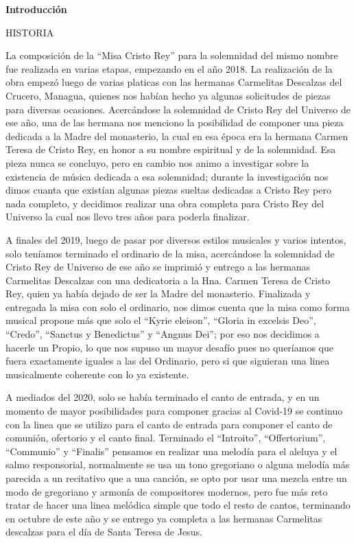 \documentclass[12pt, letterpaper]{report}
\begin{document}
    \begin{center}
        \vspace*{9cm}
        \textbf{\Huge Introducci\'on}
    \end{center}
    \clearpage

    \LARGE HISTORIA

    \Large La composici\'on de la ``Misa Cristo Rey'' para la solemnidad del mismo nombre fue realizada en varias etapas, empezando en el a\~no 2018. La realizaci\'on de la obra empez\'o luego de varias platicas con las hermanas Carmelitas Descalzas del Crucero, Managua, quienes nos hab\'ian hecho ya algunas solicitudes de piezas para diversas ocasiones. Acerc\'andose la solemnidad de Cristo Rey del Universo de ese a\~no, una de las hermana nos menciono la posibilidad de componer una pieza dedicada a la Madre del monasterio, la cual en esa \'epoca era la hermana Carmen Teresa de Cristo Rey, en honor a su nombre espiritual y de la solemnidad. Esa pieza nunca se concluyo, pero en cambio nos animo a investigar sobre la existencia de m\'usica dedicada a esa solemnidad; durante la investigaci\'on nos dimos cuanta que exist\'ian algunas piezas sueltas dedicadas a Cristo Rey pero nada completo, y decidimos realizar una obra completa para Cristo Rey del Universo la cual nos llevo tres a\~nos para poderla finalizar.

    A finales del 2019, luego de pasar por diversos estilos musicales y varios intentos, solo ten\'iamos terminado el ordinario de la misa, acerc\'andose la solemnidad de Cristo Rey de Universo de ese a\~no se imprimi\'o y entrego a las hermanas Carmelitas Descalzas con una dedicatoria a la Hna. Carmen Teresa de Cristo Rey, quien ya hab\'ia dejado de ser la Madre del monasterio. Finalizada y entregada la misa con solo el ordinario, nos dimos cuenta que la misa como forma musical propone m\'as que solo el ``Kyrie eleison'', ``Gloria in excelsis Deo'', ``Credo'', ``Sanctus y Benedictus'' y ``Angnus Dei''; por eso nos decidimos a hacerle un Propio, lo que nos supuso un mayor desaf\'io pues no quer\'iamos que fuera exactamente iguales a las del Ordinario, pero si que siguieran una linea musicalmente coherente con lo ya existente.

    A mediados del 2020, solo se hab\'ia terminado el canto de entrada, y en un momento de mayor posibilidades para componer gracias al Covid-19 se continuo con la linea que se utilizo para el canto de entrada para componer el canto de comuni\'on, ofertorio y el canto final.  Terminado el ``Introito'', ``Offertorium'', ``Communio'' y ``Finalis'' pensamos en realizar una melod\'ia para el aleluya y el salmo responsorial, normalmente se usa un tono gregoriano o alguna melod\'ia m\'as parecida a un recitativo que a una canci\'on, se opto por usar una mezcla entre un modo de gregoriano y armon\'ia de compositores modernos, pero fue m\'as reto tratar de hacer una linea mel\'odica simple que todo el resto de cantos, terminando en octubre de este a\~no y se entrego ya completa a las hermanas Carmelitas descalzas para el d\'ia de Santa Teresa de Jesus.
\end{document}
